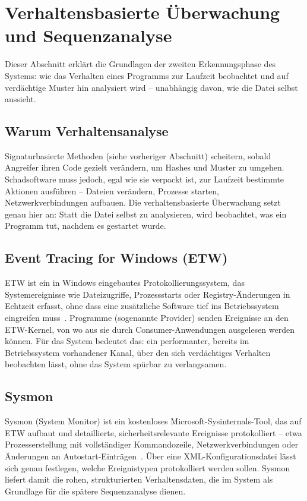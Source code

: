 \pagebreak 
{}
\section{Verhaltensbasierte Überwachung und Sequenzanalyse}

Dieser Abschnitt erklärt die Grundlagen der zweiten Erkennungsphase des
Systems: wie das Verhalten eines Programms zur Laufzeit beobachtet und
auf verdächtige Muster hin analysiert wird -- unabhängig davon, wie die
Datei selbst aussieht.

\subsection{Warum Verhaltensanalyse}

Signaturbasierte Methoden (siehe vorheriger Abschnitt) scheitern, sobald
Angreifer ihren Code gezielt verändern, um Hashes und Muster zu umgehen.
Schadsoftware muss jedoch, egal wie sie verpackt ist, zur Laufzeit
bestimmte Aktionen ausführen -- Dateien verändern, Prozesse starten,
Netzwerkverbindungen aufbauen. Die verhaltensbasierte Überwachung setzt
genau hier an: Statt die Datei selbst zu analysieren, wird beobachtet,
was ein Programm tut, nachdem es gestartet wurde.

\subsection{Event Tracing for Windows (ETW)}

\ac{ETW} ist ein in Windows eingebautes Protokollierungssystem, das
Systemereignisse wie Dateizugriffe, Prozessstarts oder
Registry-Änderungen in Echtzeit erfasst, ohne dass eine zusätzliche
Software tief ins Betriebssystem eingreifen muss~\cite{etw-docs}.
Programme (sogenannte Provider) senden Ereignisse an den ETW-Kernel, von
wo aus sie durch Consumer-Anwendungen ausgelesen werden können. Für das
System bedeutet das: ein performanter, bereits im Betriebssystem
vorhandener Kanal, über den sich verdächtiges Verhalten beobachten
lässt, ohne das System spürbar zu verlangsamen.

\subsection{Sysmon}

\ac{Sysmon} (System Monitor) ist ein kostenloses
Microsoft-Sysinternals-Tool, das auf \ac{ETW} aufbaut und detaillierte,
sicherheitsrelevante Ereignisse protokolliert -- etwa Prozesserstellung
mit vollständiger Kommandozeile, Netzwerkverbindungen oder Änderungen an
Autostart-Einträgen~\cite{sysmon-docs}. Über eine XML-Konfigurationsdatei
lässt sich genau festlegen, welche Ereignistypen protokolliert werden
sollen. Sysmon liefert damit die rohen, strukturierten Verhaltensdaten,
die im System als Grundlage für die spätere Sequenzanalyse dienen.

